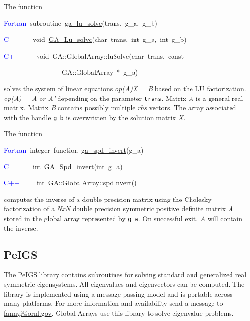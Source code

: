 The function
\begin{lyxcode}
\textcolor{blue}{Fortran}~subroutine~\href{http://www.emsl.pnl.gov/docs/global/ga_ops.html\#ga_lu_solve}{ga\_{}lu\_{}solve}(trans,~g\_a,~g\_b)~

\textcolor{blue}{C}~~~~~~~void~\href{http://www.emsl.pnl.gov/docs/global/c_nga_ops.html\#ga_lu_solve}{GA\_{}Lu\_{}solve}(char~trans,~int~g\_a,~int~g\_b)~

\textcolor{blue}{C++}~~~~~void~GA::GlobalArray::luSolve(char~trans,~const~

~~~~~~~~~~~~~~~~~GA::GlobalArray~{*}~g\_a)
\end{lyxcode}
solves the system of linear equations\emph{ op(A)X = B} based on the
LU factorization. \emph{op(A) = A or A'} depending on the parameter
\texttt{trans}. Matrix\emph{ A} is a general real matrix. Matrix \emph{B}
contains possibly multiple \emph{rhs} vectors. The array associated
with the handle \texttt{g\_b} is overwritten by the solution matrix
\emph{X}.

The function
\begin{lyxcode}
\textcolor{blue}{Fortran}~integer~function~\href{http://www.emsl.pnl.gov/docs/global/ga_ops.html\#ga_spd_invert}{ga\_{}spd\_{}invert}(g\_a)~

\textcolor{blue}{C}~~~~~~~int~\href{http://www.emsl.pnl.gov/docs/global/c_nga_ops.html\#ga_spd_invert}{GA\_{}Spd\_{}invert}(int~g\_a)~

\textcolor{blue}{C++}~~~~~int~GA::GlobalArray::spdInvert()
\end{lyxcode}
computes the inverse of a double precision matrix using the Cholesky
factorization of a \emph{NxN }double precision symmetric positive
definite matrix \emph{A} stored in the global array represented by
\texttt{g\_a}. On successful exit, \emph{A} will contain the inverse. 


\subsection{PeIGS }

The PeIGS library contains subroutines for solving standard and generalized
real symmetric eigensystems. All eigenvalues and eigenvectors can
be computed. The library is implemented using a message-passing model
and is portable across many platforms. For more information and availability
send a message to \href{mailto:fanngi@ornl.gov}{fanngi@ornl.gov}.
Global Arrays use this library to solve eigenvalue problems.

